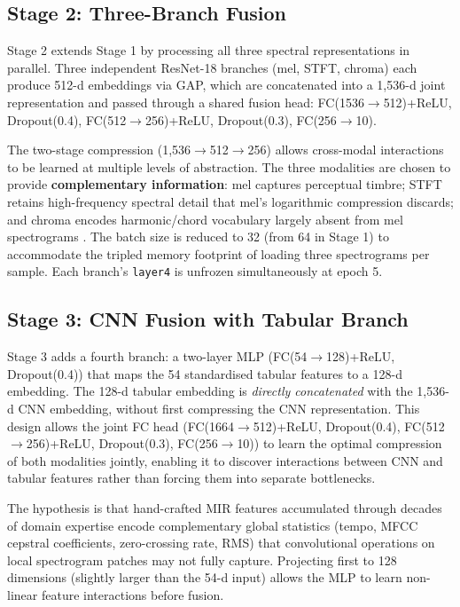 \documentclass[10pt, twocolumn, a4paper]{article}
\begin{document}
\subsection{Stage 2: Three-Branch Fusion}

Stage 2 extends Stage 1 by processing all three spectral representations in parallel. Three independent ResNet-18 branches (mel, STFT, chroma) each produce 512-d embeddings via GAP, which are concatenated into a 1,536-d joint representation and passed through a shared fusion head: FC(1536$\to$512)+ReLU, Dropout(0.4), FC(512$\to$256)+ReLU, Dropout(0.3), FC(256$\to$10).

The two-stage compression (1,536$\to$512$\to$256) allows cross-modal interactions to be learned at multiple levels of abstraction. The three modalities are chosen to provide \textbf{complementary information}: mel captures perceptual timbre; STFT retains high-frequency spectral detail that mel's logarithmic compression discards; and chroma encodes harmonic/chord vocabulary largely absent from mel spectrograms \cite{wolfmonheim2024, zhang2025}. The batch size is reduced to 32 (from 64 in Stage 1) to accommodate the tripled memory footprint of loading three spectrograms per sample. Each branch's \texttt{layer4} is unfrozen simultaneously at epoch 5.

\subsection{Stage 3: CNN Fusion with Tabular Branch}

Stage 3 adds a fourth branch: a two-layer MLP (FC(54$\to$128)+ReLU, Dropout(0.4)) that maps the 54 standardised tabular features to a 128-d embedding. The 128-d tabular embedding is \textit{directly concatenated} with the 1,536-d CNN embedding, without first compressing the CNN representation. This design allows the joint FC head (FC(1664$\to$512)+ReLU, Dropout(0.4), FC(512$\to$256)+ReLU, Dropout(0.3), FC(256$\to$10)) to learn the optimal compression of both modalities jointly, enabling it to discover interactions between CNN and tabular features rather than forcing them into separate bottlenecks.

The hypothesis is that hand-crafted MIR features accumulated through decades of domain expertise \cite{tzanetakis2002} encode complementary global statistics (tempo, MFCC cepstral coefficients, zero-crossing rate, RMS) that convolutional operations on local spectrogram patches may not fully capture. Projecting first to 128 dimensions (slightly larger than the 54-d input) allows the MLP to learn non-linear feature interactions before fusion.
\end{document}
